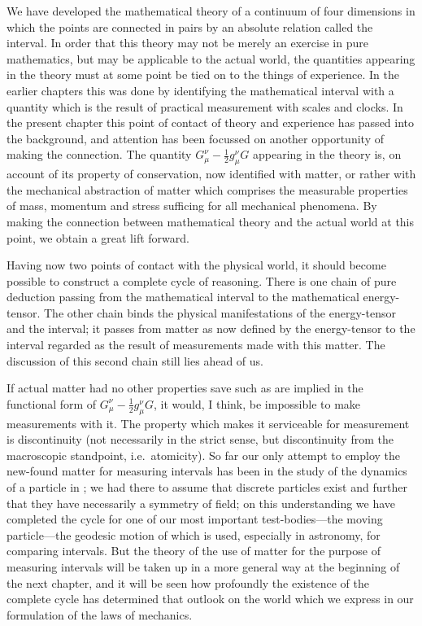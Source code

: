 \documentclass[12pt]{book}
\begin{document}

We have developed the mathematical theory of a continuum of four
dimensions in which the points are connected in pairs by an absolute relation
called the interval. In order that this theory may not be merely an exercise
in pure mathematics, but may be applicable to the actual world, the quantities
appearing in the theory must at some point be tied on to the things of
experience. In the earlier chapters this was done by identifying the mathematical
interval with a quantity which is the result of practical measurement
with scales and clocks. In the present chapter this point of contact of theory
and experience has passed into the background, and attention has been
focussed on another opportunity of making the connection. The quantity
$G_{\mu}^{\nu} - \frac{1}{2} g_{\mu}^{\nu}G$ appearing in the theory is, on account of its property of conservation,
now identified with matter, or rather with the mechanical abstraction
%
of matter which comprises the measurable properties of mass, momentum and
stress sufficing for all mechanical phenomena. By making the connection
between mathematical theory and the actual world at this point, we obtain a
great lift forward.

Having now two points of contact with the physical world, it should
become possible to construct a complete cycle of reasoning. There is one
chain of pure deduction passing from the mathematical interval to the mathematical
energy\hyp{}tensor. The other chain binds the physical manifestations of
the energy\hyp{}tensor and the interval; it passes from matter as now defined by
the energy\hyp{}tensor to the interval regarded as the result of measurements made
with this matter. The discussion of this second chain still lies ahead of us.

If actual matter had no other properties save such as are implied in the
functional form of $G_{\mu}^{\nu} - \frac{1}{2} g_{\mu}^{\nu}G$, it would, I think, be impossible to make measurements
with it. The property which makes it serviceable for measurement is
discontinuity (not necessarily in the strict sense, but discontinuity from the
macroscopic standpoint, i.e.\ atomicity). So far our only attempt to employ
%
the new-found matter for measuring intervals has been in the study of the
dynamics of a particle in ; we had there to assume that discrete particles
exist and further that they have necessarily a symmetry of field; on this
understanding we have completed the cycle for one of our most important
test\hyp{}bodies---the moving particle---the geodesic motion of which is used, especially
in astronomy, for comparing intervals. But the theory of the use of
matter for the purpose of measuring intervals will be taken up in a more
general way at the beginning of the next chapter, and it will be seen how
profoundly the existence of the complete cycle has determined that outlook
on the world which we express in our formulation of the laws of mechanics.
\end{document}
